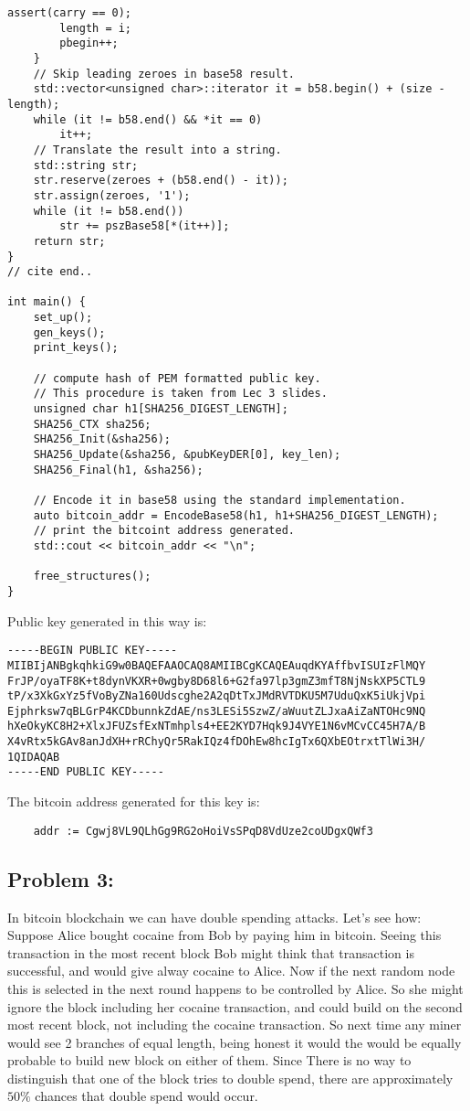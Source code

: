 \documentclass[a4paper]{article}
\begin{document}
\begin{lstlisting}[style=C++]
        assert(carry == 0);
        length = i;
        pbegin++;
    }
    // Skip leading zeroes in base58 result.
    std::vector<unsigned char>::iterator it = b58.begin() + (size - length);
    while (it != b58.end() && *it == 0)
        it++;
    // Translate the result into a string.
    std::string str;
    str.reserve(zeroes + (b58.end() - it));
    str.assign(zeroes, '1');
    while (it != b58.end())
        str += pszBase58[*(it++)];
    return str;
}
// cite end..

int main() {
    set_up();
    gen_keys();
    print_keys();

    // compute hash of PEM formatted public key.
    // This procedure is taken from Lec 3 slides.
    unsigned char h1[SHA256_DIGEST_LENGTH];
    SHA256_CTX sha256;
    SHA256_Init(&sha256);
    SHA256_Update(&sha256, &pubKeyDER[0], key_len);
    SHA256_Final(h1, &sha256);

    // Encode it in base58 using the standard implementation.
    auto bitcoin_addr = EncodeBase58(h1, h1+SHA256_DIGEST_LENGTH);
    // print the bitcoint address generated.
    std::cout << bitcoin_addr << "\n";

    free_structures();
}
\end{lstlisting}
Public key generated in this way is:
\begin{lstlisting}
-----BEGIN PUBLIC KEY-----
MIIBIjANBgkqhkiG9w0BAQEFAAOCAQ8AMIIBCgKCAQEAuqdKYAffbvISUIzFlMQY
FrJP/oyaTF8K+t8dynVKXR+0wgby8D68l6+G2fa97lp3gmZ3mfT8NjNskXP5CTL9
tP/x3XkGxYz5fVoByZNa160Udscghe2A2qDtTxJMdRVTDKU5M7UduQxK5iUkjVpi
Ejphrksw7qBLGrP4KCDbunnkZdAE/ns3LESi5SzwZ/aWuutZLJxaAiZaNTOHc9NQ
hXeOkyKC8H2+XlxJFUZsfExNTmhpls4+EE2KYD7Hqk9J4VYE1N6vMCvCC45H7A/B
X4vRtx5kGAv8anJdXH+rRChyQr5RakIQz4fDOhEw8hcIgTx6QXbEOtrxtTlWi3H/
1QIDAQAB
-----END PUBLIC KEY-----
\end{lstlisting}
The bitcoin address generated for this key is:
\begin{lstlisting}
    addr := Cgwj8VL9QLhGg9RG2oHoiVsSPqD8VdUze2coUDgxQWf3
\end{lstlisting}

\subsection*{Problem 3:}
In bitcoin blockchain we can have double spending attacks. Let's see how: \\

Suppose Alice bought cocaine from Bob by paying him in bitcoin. Seeing this transaction in the most
recent block Bob might think that transaction is successful, and would give alway cocaine to Alice.
Now if the next random node this is selected in the next round happens to be controlled by Alice.
So she might ignore the block including her cocaine transaction, and could build on the second most recent block,
not including the cocaine transaction. So next time any miner would see 2 branches of equal length,
being honest it would the would be equally probable to build new block on either of them. Since There
is no way to distinguish that one of the block tries to double spend, there are approximately $50\%$ chances
that double spend would occur.\\
\end{document}
